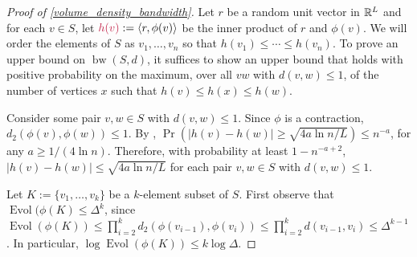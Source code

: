 \documentclass{patmorin}
\makeatletter
\renewcommand{\ge}{\geqslant}
\renewcommand{\le}{\leqslant}
\def\mathcolor#1#{\@mathcolor{#1}}
\def\@mathcolor#1#2#3{%
  \protect\leavevmode
  \begingroup
    \color#1{#2}#3%
  \endgroup
}
\newcommand{\mathdefin}[1]{\mathcolor{brightmaroon}{#1}}
\DeclareMathOperator{\bw}{bw}
\DeclareMathOperator{\evol}{Evol}
\makeatother
\begin{document}
\begin{proof}[Proof of \cref{volume_density_bandwidth}]
  Let $r$ be a random unit vector in $\mathbb{R}^L$ and for each $v\in S$, let $\mathdefin{h(v)}:=\langle r,\phi(v)\rangle$ be the inner product of $r$ and $\phi(v)$.  We will order the elements of $S$ as $v_1,\ldots,v_n$ so that $h(v_1)\le \cdots \le h(v_n)$.  To prove an upper bound on $\bw(S,d)$, it suffices to show an upper bound that holds with positive probability on the maximum, over all $vw$ with $d(v,w)\le 1$, of the number of vertices $x$ such that $h(v)\le h(x)\le h(w)$.

  Consider some pair $v,w\in S$ with $d(v,w)\le 1$. Since $\phi$ is a contraction, $d_2(\phi(v),\phi(w))\le 1$.  By \cite[Proposition~7]{feige:approximating}, $\Pr(|h(v)-h(w)|\ge \sqrt{4a\ln n/L}) \le n^{-a}$, for any $a\ge 1/(4\ln n)$. Therefore, with probability at least $1-n^{-a+2}$, $|h(v)-h(w)|\le \sqrt{4a\ln n/L}$ for each pair $v,w\in S$ with $d(v,w)\le 1$.

  Let  $K:=\{v_1,\ldots,v_k\}$ be a $k$-element subset of $S$. First observe that $\evol(\phi(K)\le \Delta^k$, since $\evol(\phi(K))\le\prod_{i=2}^k d_2(\phi(v_{i-1}),\phi(v_i))\le \prod_{i=2}^k d(v_{i-1},v_i)\le \Delta^{k-1}$.  In particular, $\log\evol(\phi(K))\le k\log \Delta$.


\end{proof}
\end{document}
